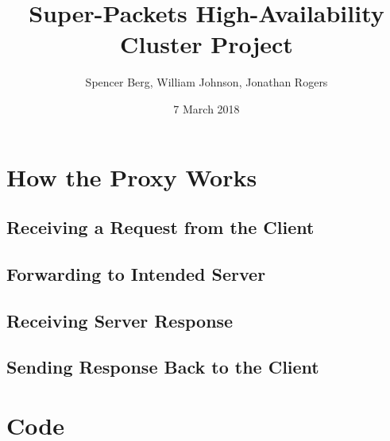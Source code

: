 \documentclass[11pt]{article}
\title{Super-Packets High-Availability Cluster Project}
\author{Spencer Berg, William Johnson, Jonathan Rogers}
\date{7 March 2018}
\begin{document}
\maketitle

\thispagestyle{empty}

\begin{doublespace}



\end{doublespace}

\section{How the Proxy Works}
\subsection{Receiving a Request from the Client}
\subsection{Forwarding to Intended Server}
\subsection{Receiving Server Response}
\subsection{Sending Response Back to the Client}
\section{Code}
\end{document}
